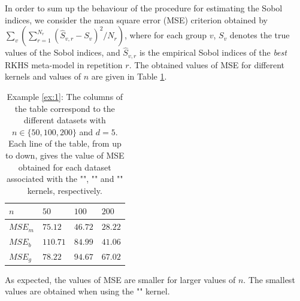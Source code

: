In order to sum up the behaviour of the procedure for estimating the Sobol indices, we consider the mean square error (MSE) criterion obtained by $\sum_v(\sum_{r=1}^{N_r}(\widehat{S}_{v,r}-S_{v})^2/{N_r})$, where for each group $v$, $S_v$ denotes the true values of the Sobol indices, and $\widehat{S}_{v,r}$ is the empirical Sobol indices of the \textit{best} RKHS meta-model in repetition $r$. The obtained values of MSE for different kernels and values of $n$ are given in Table \ref{tab:bvarex1}. 
\begin{table}[h!]
\centering
\small{
{\setlength{\tabcolsep}{4pt}
\begin{tabular}{l|lll} 
$n$         & $50$           & $100$         & $200$ \\ \hline
$MSE_m$     & $75.12$   & $46.72$  & $28.22$ \\
$MSE_b$     & $110.71$  & $84.99$  & $41.06$ \\
$MSE_g$     & $78.22$   & $94.67$  & $67.02$ \\
\end{tabular}}}
\caption{Example \ref{ex:1}: The columns of the table correspond to the different datasets with $n\in\{50,100,200\}$ and $d=5$. Each line of the table, from up to down, gives the value of MSE  obtained for each dataset associated with the "", "" and "" kernels, respectively.}
\label{tab:bvarex1}
\end{table} 
As expected, the values of MSE are smaller for larger values of $n$. The smallest values are obtained when using the "" kernel.

